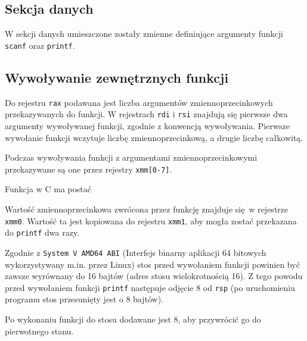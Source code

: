 \documentclass[polish, 11pt]{article}
\begin{document}
	\subsection{Sekcja danych}
		\begin{minipage}{.5\textwidth}
			W sekcji danych umieszczone zostały zmienne definiujące argumenty funkcji \verb|scanf| oraz \verb|printf|.			
		\end{minipage}%
		\hspace{1cm}
		\begin{minipage}{.5\textwidth}
			
		\end{minipage}

	\subsection{Wywoływanie zewnętrznych funkcji}	
		\begin{minipage}{.5\textwidth}
			Do rejestru \verb|rax| podawana jest liczba argumentów zmiennoprzecinkowych przekazywanych do funkcji.
			W rejestrach \verb|rdi| i \verb|rsi| znajdują się pierwsze dwa argumenty wywoływanej funkcji, zgodnie z konwencją wywoływania.
			Pierwsze wywołanie funkcji wczytuje liczbę zmiennoprzecinkową, a drugie liczbę całkowitą.

			Podczas wywoływania funkcji z argumentami zmiennoprzecinkowymi przekazywane są one przez rejestry \verb|xmm[0-7]|.
			
			Funkcja w C ma postać

			Wartość zmiennoprzecinkowa zwrócona przez funkcję znajduje się w rejestrze \verb|xmm0|.
			Wartość ta jest kopiowana do rejestru \verb|xmm1|, aby mogła zostać przekazana do \verb|printf| dwa razy.

			Zgodnie z \verb|System V AMD64 ABI| (Interfejs binarny aplikacji 64 bitowych wykorzystywany m.in. przez Linux)
			stos przed wywołaniem funkcji powinien być zawsze wyrównany do 16 bajtów (adres stosu wielokrotnością 16).
			Z tego powodu przed wywołaniem funkcji \verb|printf| następuje odjęcie 8 od \verb|rsp|
			(po uruchomieniu programu stos przesunięty jest o 8 bajtów).

			Po wykonaniu funkcji do stosu dodawane jest 8, aby przywrócić go do pierwotnego stanu.

		\end{minipage}%
		\hspace{1cm}
		\begin{minipage}{.5\textwidth}
			
		\end{minipage}
\end{document}
